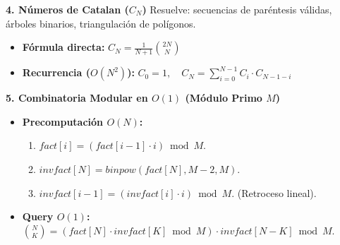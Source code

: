 \textbf{4. Números de Catalan ($C_N$)}
Resuelve: secuencias de paréntesis válidas, árboles binarios, triangulación de polígonos.
\begin{itemize}
    \item \textbf{Fórmula directa:} $C_N = \frac{1}{N+1} \binom{2N}{N}$
    \item \textbf{Recurrencia ($O(N^2)$):} $C_0 = 1, \quad C_N = \sum_{i=0}^{N-1} C_i \cdot C_{N-1-i}$
\end{itemize}

\textbf{5. Combinatoria Modular en $O(1)$ (Módulo Primo $M$)}
\begin{itemize}
    \item \textbf{Precomputación $O(N)$:}
    \begin{enumerate}
        \item $fact[i] = (fact[i-1] \cdot i) \bmod M$.
        \item $invfact[N] = binpow(fact[N], M-2, M)$.
        \item $invfact[i-1] = (invfact[i] \cdot i) \bmod M$. (Retroceso lineal).
    \end{enumerate}
    \item \textbf{Query $O(1)$:} $\binom{N}{K} = (fact[N] \cdot invfact[K] \bmod M) \cdot invfact[N-K] \bmod M$.
\end{itemize}